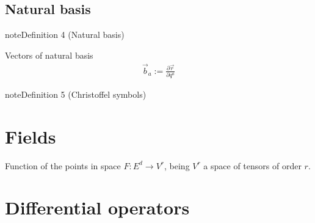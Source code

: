 \documentclass[letterpaper,10pt,english]{jupyterBook}
\begin{document}
\subsection{Natural basis}
\label{\detokenize{ch/tensor-algebra-calculus/calculus-euclidean:natural-basis}}\label{\detokenize{ch/tensor-algebra-calculus/calculus-euclidean:tensor-calculus-coordinates-natural-basis}}\label{ch/tensor-algebra-calculus/calculus-euclidean:definition-1}
\begin{sphinxadmonition}{note}{Definition 4 (Natural basis)}



\sphinxAtStartPar
Vectors of natural basis
\begin{equation*}
\begin{split}\vec{b}_a := \frac{\partial \vec{r}}{\partial q^a}\end{split}
\end{equation*}\end{sphinxadmonition}
\label{ch/tensor-algebra-calculus/calculus-euclidean:definition-2}
\begin{sphinxadmonition}{note}{Definition 5 (Christoffel symbols)}


\end{sphinxadmonition}


\section{Fields}
\label{\detokenize{ch/tensor-algebra-calculus/calculus-euclidean:fields}}\label{\detokenize{ch/tensor-algebra-calculus/calculus-euclidean:tensor-calculus-fields}}
\sphinxAtStartPar
Function of the points in space \(F: E^d \rightarrow V^r\), being \(V^r\) a space of tensors of order \(r\).


\section{Differential operators}
\label{\detokenize{ch/tensor-algebra-calculus/calculus-euclidean:differential-operators}}\label{\detokenize{ch/tensor-algebra-calculus/calculus-euclidean:tensor-calculus-differential-operators}}
\end{document}
